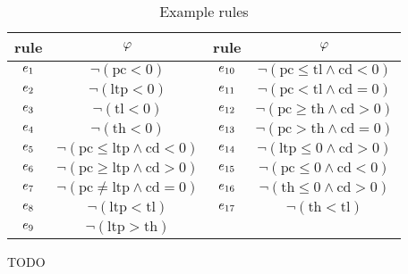 \begin{table}[hb]%
    \caption{Example rules}
    \label{tab:runningexamplerules}
    \begin{tabular}{c|c||c|c}
        \toprule
        \textbf{rule} & $\varphi$ & \textbf{rule} & $\varphi$ \\
        \midrule
        $e_{1}$ & $\neg (\text{pc} < 0)$ & $e_{10}$ & $\neg (\text{pc} \leq \text{tl} \wedge \text{cd} < 0)$ \\
        $e_{2}$ & $\neg (\text{ltp} < 0)$ & $e_{11}$ & $\neg (\text{pc} < \text{tl} \wedge \text{cd} = 0)$ \\
        $e_{3}$ & $\neg (\text{tl} < 0)$ & $e_{12}$ & $\neg (\text{pc} \geq \text{th} \wedge \text{cd} > 0)$ \\
        $e_{4}$ & $\neg (\text{th} < 0)$ & $e_{13}$ & $\neg (\text{pc} > \text{th} \wedge \text{cd} = 0)$ \\
        $e_{5}$ & $\neg (\text{pc} \leq \text{ltp} \wedge \text{cd} < 0)$ & $e_{14}$ & $\neg (\text{ltp} \leq 0 \wedge \text{cd} > 0)$ \\
        $e_{6}$ & $\neg (\text{pc} \geq \text{ltp} \wedge \text{cd} > 0)$ & $e_{15}$ & $\neg (\text{pc} \leq 0 \wedge \text{cd} < 0)$ \\
        $e_{7}$ & $\neg (\text{pc} \neq \text{ltp} \wedge \text{cd} = 0)$ & $e_{16}$ & $\neg (\text{th} \leq 0 \wedge \text{cd} > 0)$ \\
        $e_{8}$ & $\neg (\text{ltp} < \text{tl})$ & $e_{17}$ & $\neg (\text{th} < \text{tl})$ \\
        $e_{9}$ & $\neg (\text{ltp} > \text{th})$ & & \\
        \bottomrule
    \end{tabular}
\end{table}

\begin{example}
\label{ex:runningexample}
    TODO
\end{example}
